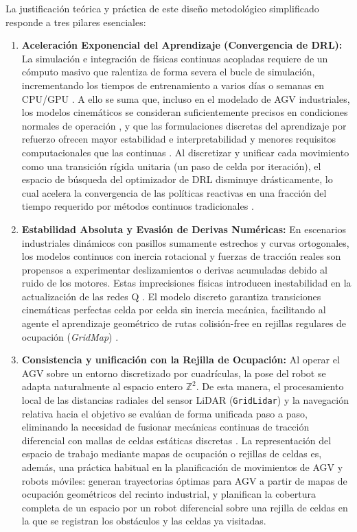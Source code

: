 La justificación teórica y práctica de este diseño metodológico simplificado responde a tres pilares esenciales:
\begin{enumerate}
    \item \textbf{Aceleración Exponencial del Aprendizaje (Convergencia de DRL):} La simulación e integración de físicas continuas acopladas requiere de un cómputo masivo que ralentiza de forma severa el bucle de simulación, incrementando los tiempos de entrenamiento a varios días o semanas en CPU/GPU \citep{sivashangaran2023deep}. A ello se suma que, incluso en el modelado de AGV industriales, los modelos cinemáticos se consideran suficientemente precisos en condiciones normales de operación \citep{sanchez2022modelado}, y que las formulaciones discretas del aprendizaje por refuerzo ofrecen mayor estabilidad e interpretabilidad y menores requisitos computacionales que las continuas \citep{gilmacia2025exponential}. Al discretizar y unificar cada movimiento como una transición rígida unitaria (un paso de celda por iteración), el espacio de búsqueda del optimizador de DRL disminuye drásticamente, lo cual acelera la convergencia de las políticas reactivas en una fracción del tiempo requerido por métodos continuos tradicionales \citep{xue2022using}.
    \item \textbf{Estabilidad Absoluta y Evasión de Derivas Numéricas:} En escenarios industriales dinámicos con pasillos sumamente estrechos y curvas ortogonales, los modelos continuos con inercia rotacional y fuerzas de tracción reales son propensos a experimentar deslizamientos o derivas acumuladas debido al ruido de los motores. Estas imprecisiones físicas introducen inestabilidad en la actualización de las redes Q \citep{xue2022using}. El modelo discreto garantiza transiciones cinemáticas perfectas celda por celda sin inercia mecánica, facilitando al agente el aprendizaje geométrico de rutas colisión-free en rejillas regulares de ocupación (\textit{GridMap}) \citep{robot.py}.
    \item \textbf{Consistencia y unificación con la Rejilla de Ocupación:} Al operar el AGV sobre un entorno discretizado por cuadrículas, la pose del robot se adapta naturalmente al espacio entero $\mathbb{Z}^2$. De esta manera, el procesamiento local de las distancias radiales del sensor LiDAR (\texttt{GridLidar}) y la navegación relativa hacia el objetivo se evalúan de forma unificada paso a paso, eliminando la necesidad de fusionar mecánicas continuas de tracción diferencial con mallas de celdas estáticas discretas \citep{grid_training_19.py}. La representación del espacio de trabajo mediante mapas de ocupación o rejillas de celdas es, además, una práctica habitual en la planificación de movimientos de AGV y robots móviles: \citet{bayona2024comparative} generan trayectorias óptimas para AGV a partir de mapas de ocupación geométricos del recinto industrial, y \citet{rodrigo2023gbnn} planifican la cobertura completa de un espacio por un robot diferencial sobre una rejilla de celdas en la que se registran los obstáculos y las celdas ya visitadas.
\end{enumerate}

